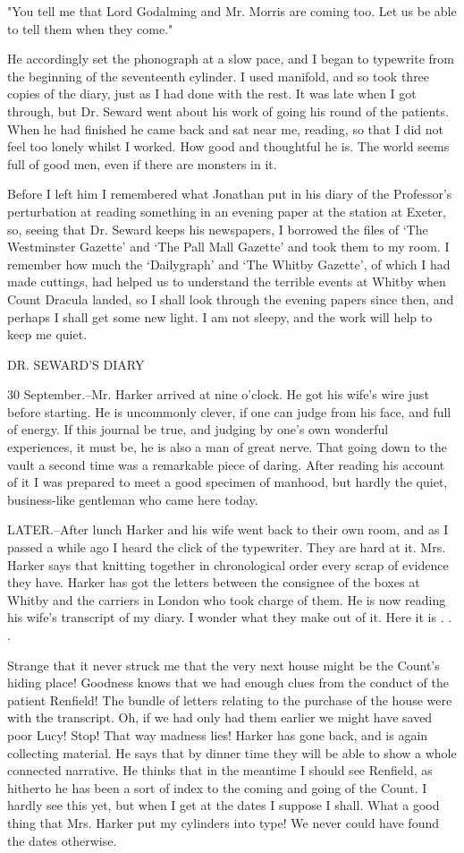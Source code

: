 "You tell me that Lord Godalming and Mr. Morris are coming too. Let us be able to tell them when they come." 

He accordingly set the phonograph at a slow pace, and I began to typewrite from the beginning of the seventeenth cylinder. I used manifold, and so took three copies of the diary, just as I had done with the rest. It was late when I got through, but Dr. Seward went about his work of going his round of the patients. When he had finished he came back and sat near me, reading, so that I did not feel too lonely whilst I worked. How good and thoughtful he is. The world seems full of good men, even if there are monsters in it. 

Before I left him I remembered what Jonathan put in his diary of the Professor's perturbation at reading something in an evening paper at the station at Exeter, so, seeing that Dr. Seward keeps his newspapers, I borrowed the files of `The Westminster Gazette' and `The Pall Mall Gazette' and took them to my room. I remember how much the `Dailygraph' and `The Whitby Gazette', of which I had made cuttings, had helped us to understand the terrible events at Whitby when Count Dracula landed, so I shall look through the evening papers since then, and perhaps I shall get some new light. I am not sleepy, and the work will help to keep me quiet. 

DR. SEWARD'S DIARY 

30 September.--Mr. Harker arrived at nine o'clock. He got his wife's wire just before starting. He is uncommonly clever, if one can judge from his face, and full of energy. If this journal be true, and judging by one's own wonderful experiences, it must be, he is also a man of great nerve. That going down to the vault a second time was a remarkable piece of daring. After reading his account of it I was prepared to meet a good specimen of manhood, but hardly the quiet, business-like gentleman who came here today. 

LATER.--After lunch Harker and his wife went back to their own room, and as I passed a while ago I heard the click of the typewriter. They are hard at it. Mrs. Harker says that knitting together in chronological order every scrap of evidence they have. Harker has got the letters between the consignee of the boxes at Whitby and the carriers in London who took charge of them. He is now reading his wife's transcript of my diary. I wonder what they make out of it. Here it is . . . 

Strange that it never struck me that the very next house might be the Count's hiding place! Goodness knows that we had enough clues from the conduct of the patient Renfield! The bundle of letters relating to the purchase of the house were with the transcript. Oh, if we had only had them earlier we might have saved poor Lucy! Stop! That way madness lies! Harker has gone back, and is again collecting material. He says that by dinner time they will be able to show a whole connected narrative. He thinks that in the meantime I should see Renfield, as hitherto he has been a sort of index to the coming and going of the Count. I hardly see this yet, but when I get at the dates I suppose I shall. What a good thing that Mrs. Harker put my cylinders into type! We never could have found the dates otherwise. 

